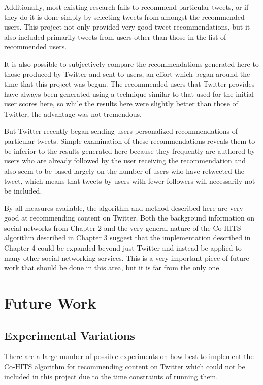 Additionally, most existing research fails to recommend particular tweets, or if they do it is done simply by selecting tweets from amongst the recommended users. This project not only provided very good tweet recommendations, but it also included primarily tweets from users other than those in the list of recommended users.

It is also possible to subjectively compare the recommendations generated here to those produced by Twitter and sent to users, an effort which began around the time that this project was begun. The recommended users that Twitter provides have always been generated using a technique similar to that used for the initial user scores here, so while the results here were slightly better than those of Twitter, the advantage was not tremendous.

But Twitter recently began sending users personalized recommendations of particular tweets. Simple examination of these recommendations reveals them to be inferior to the results generated here because they frequently are authored by users who are already followed by the user receiving the recommendation and also seem to be based largely on the number of users who have retweeted the tweet, which means that tweets by users with fewer followers will necessarily not be included.

By all measures available, the algorithm and method described here are very good at recommending content on Twitter. Both the background information on social networks from Chapter 2 and the very general nature of the Co-HITS algorithm described in Chapter 3 suggest that the implementation described in Chapter 4 could be expanded beyond just Twitter and instead be applied to many other social networking services. This is a very important piece of future work that should be done in this area, but it is far from the only one.


\section{Future Work}

\subsection{Experimental Variations}

There are a large number of possible experiments on how best to implement the Co-HITS algorithm for recommending content on Twitter which could not be included in this project due to the time constraints of running them.

